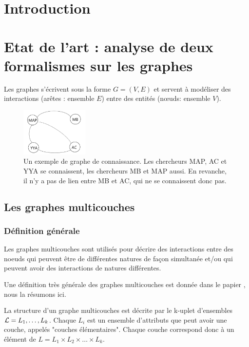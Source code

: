 \documentclass[11pt,a4paper]{article}
\theoremstyle{definition}
\theoremstyle{remark}
\theoremstyle{remark}
\begin{document}
\newpage 

\tableofcontents
\newpage



\section*{Introduction}

\section{Etat de l'art : analyse de deux formalismes sur les graphes}
\indent

Les graphes s'écrivent sous la forme $G=(V,E)$ et servent à modéliser des interactions (arêtes : ensemble $E$) entre des entités (nœuds: ensemble $V$). 

\begin{figure}[H]
	\centering
	\includegraphics[width=0.3\textwidth]{exGraphe.JPG}
	\caption{Un exemple de graphe de connaissance. Les chercheurs MAP, AC et YYA se connaissent, les chercheurs MB et MAP aussi. En revanche, il n'y a pas de lien entre MB et AC, qui ne se connaissent donc pas.}
\end{figure}

\subsection{Les graphes multicouches}

\subsubsection{Définition générale}

 Les graphes multicouches sont utilisés pour décrire des interactions entre des noeuds qui peuvent être de différentes natures de façon simultanée et/ou qui peuvent avoir des interactions de natures différentes. 
 
 Une définition très générale des graphes multicouches est donnée dans le papier \cite{mlkiv}, nous la résumons ici.
 
 La structure d'un graphe multicouches est décrite par le k-uplet d'ensembles ${\cal L} = L_1, \dots , L_k$. Chaque $L_i$ est un ensemble d'attributs que peut avoir une couche, appelés "couches élémentaires". Chaque couche correspond donc à un élément de $L=L_1\times L_2 \times \dots \times L_k$.
 
\end{document}
